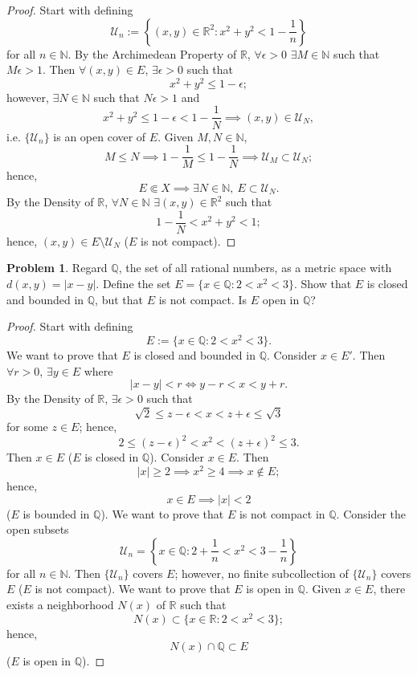 \documentclass{amsart}
\theoremstyle{definition}
\newtheorem{problem}{Problem}
\begin{document}
\begin{proof}
    Start with defining
    \[
    \mathcal{U}_n := \left \{(x,y) \in \mathbb{R}^2 : x^2 + y^2 < 1 - \frac{1}{n}\right \}
    \]
    for all $n \in \mathbb{N}$. By the Archimedean Property of $\mathbb{R}$, $\forall \epsilon > 0$ $\exists M \in \mathbb{N}$ such that $M\epsilon > 1$. Then $\forall (x,y) \in E$, $\exists \epsilon > 0$ such that
    \[
    x^2 + y^2 \leq 1 - \epsilon;
    \]
    however, $\exists N \in \mathbb{N}$ such that $N\epsilon > 1$ and 
    \[
    x^2 + y^2 \leq 1 - \epsilon < 1 - \frac{1}{N} \implies (x,y) \in \mathcal{U}_N,
    \]
    i.e. $\{\mathcal{U}_n\}$ is an open cover of $E$. Given $M,N \in \mathbb{N}$, 
    \[
    M \leq N \implies 1 - \frac{1}{M} \leq 1 - \frac{1}{N} \implies \mathcal{U}_M \subset \mathcal{U}_N;
    \]
    hence,
    \[
    E \Subset X \implies \exists N \in \mathbb{N}, \ E \subset \mathcal{U}_N.
    \]
    By the Density of $\mathbb{R}$, $\forall N \in \mathbb{N}$ $\exists (x,y) \in \mathbb{R}^2$ such that 
    \[
    1 - \frac{1}{N} < x^2 + y^2 < 1; 
    \]
    hence, $(x,y) \in E \setminus \mathcal{U}_N$ ($E$ is not compact).
\end{proof}

\begin{problem}
    Regard $\mathbb{Q}$, the set of all rational numbers, as a metric space with $d(x,y) = \vert x - y \vert$. Define the set $E = \{x \in \mathbb{Q} : 2 < x^2 < 3\}$. Show that $E$ is closed and bounded in $\mathbb{Q}$, but that $E$ is not compact. Is $E$ open in $\mathbb{Q}$?
\end{problem}

\begin{proof}
    Start with defining
    \[
    E := \{x \in \mathbb{Q} : 2 < x^2 < 3\}.
    \]
    We want to prove that $E$ is closed and bounded in $\mathbb{Q}$. Consider $x \in E'$. Then $\forall r > 0$, $\exists y \in E$ where
    \[
    \vert x - y \vert < r \iff y - r < x < y + r.
    \]
    By the Density of $\mathbb{R}$, $\exists \epsilon > 0$ such that
    \[
    \sqrt{2} \leq z - \epsilon < x < z + \epsilon \leq \sqrt{3}
    \]
    for some $z \in E$; hence, 
    \[
    2 \leq (z - \epsilon)^2 < x^2 < (z + \epsilon)^2 \leq 3.
    \]
    Then $x \in E$ ($E$ is closed in $\mathbb{Q}$). Consider $x \in E$. Then 
    \[
    \vert x \vert \geq 2 \implies x^2 \geq 4 \implies x \not \in E;
    \]
    hence,
    \[
    x \in E \implies \vert x \vert < 2
    \]
    ($E$ is bounded in $\mathbb{Q}$). We want to prove that $E$ is not compact in $\mathbb{Q}$. Consider the open subsets 
    \[
    \mathcal{U}_{n} = \left\{x \in \mathbb{Q} : 2 + \frac{1}{n} < x^2 < 3 - \frac{1}{n}\right\} 
    \]
    for all $n \in \mathbb{N}$. Then $\{\mathcal{U}_{n}\}$ covers $E$; however, no finite subcollection of $\{\mathcal{U}_{n}\}$ covers $E$ ($E$ is not compact). We want to prove that $E$ is open in $\mathbb{Q}$. Given $x \in E$, there exists a neighborhood $N(x)$ of $\mathbb{R}$ such that 
    \[
    N(x) \subset \{x \in \mathbb{R} : 2 < x^2 < 3\};
    \]
    hence,
    \[
    N(x) \cap \mathbb{Q} \subset E
    \]
    ($E$ is open in $\mathbb{Q}$).
\end{proof}
\end{document}
